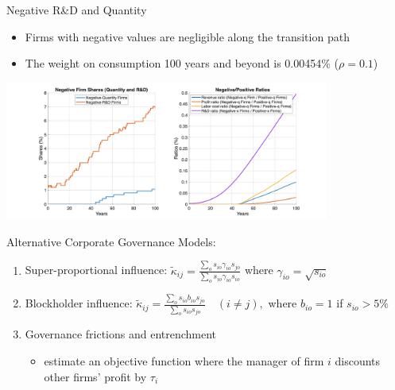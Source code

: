 \documentclass[
  10pt,
  aspectratio=169,   %
]{beamer}
\theoremstyle{plain}
\begin{document}
\begin{frame}{Negative R\&D and Quantity}
  \begin{itemize}
  \item Firms with negative values are negligible along the transition path
  \item The weight on consumption 100 years and beyond is 0.00454\% ($\rho=0.1$)
  \end{itemize}
  \begin{center}
    \includegraphics[width=0.8\textwidth]{figures/transition_path_analysis.png}
  \end{center}
\end{frame}

\begin{frame}{Alternative Corporate Governance Models: \\ \citet{Ederer2024-rw}}
  \begin{enumerate}
    \item Super-proportional influence: $\tilde{\kappa}_{ij}=\frac{\sum_{o}s_{io}\gamma_{io}s_{jo}}{\sum_{o}s_{io}\gamma_{io}s_{io}}$ where $\gamma_{io}=\sqrt{s_{io}}$
          \medskip{}
    \item Blockholder influence: $\tilde{\kappa}_{ij}=\frac{\sum_{o}s_{io}b_{io}s_{jo}}{\sum_{o}s_{io}s_{jo}}\quad(i\neq j),$ where $b_{io}=1$ if $s_{io}>5\%$
          \medskip{}
    \item Governance frictions and entrenchment
          \begin{itemize}
            \item \citet{Azar2021-mb} estimate an objective function where the manager of firm $i$ discounts other firms' profit by $\tau_{i}$
          \end{itemize}
  \end{enumerate}
\end{frame}
\end{document}
